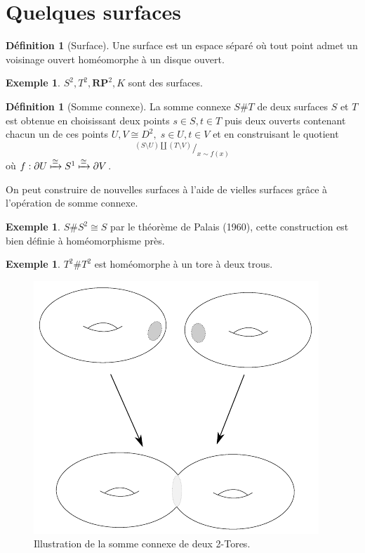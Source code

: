 \documentclass[12pt]{book}
\theoremstyle{definition}
\newtheorem{definition}[lemma]{Définition}
\newtheorem{example}[lemma]{Exemple}
\theoremstyle{remark}
\newcommand*\quot[2]{{^{\textstyle #1}\big/_{\textstyle #2}}}
\begin{document}
	\section{Quelques surfaces}
	\begin{definition}[Surface]
		Une surface est un espace séparé où tout point admet un voisinage ouvert homéomorphe à un disque ouvert.	
	\end{definition}
	\begin{example}
		$S^2, T^2, \mathbf{RP}^2, K$ sont des surfaces. 
	\end{example}
	\begin{definition}[Somme connexe]
		La somme connexe $S\#T$ de deux surfaces $S$ et $T$ est obtenue en choisissant deux points $s \in S, t \in T$ puis deux ouverts contenant chacun un de ces points $U, V \cong D^2, \; s \in U, t \in V$ et en construisant le quotient \[
			\quot{(S\setminus U)\coprod (T \setminus V)}{x\sim f(x)}
		\] 
			où $f : \partial U \xmapsto{\cong} S^1 \xmapsto{\cong} \partial V$.
	\end{definition}
	On peut construire de nouvelles surfaces à l'aide de vielles surfaces grâce à l'opération de somme connexe.
	\begin{example}
		$S\#S^2 \cong S$ par le théorème de Palais (1960), cette construction est bien définie à homéomorphisme près.
	\end{example}
	\begin{example}
		$T^2\#T^2$ est homéomorphe à un tore à deux trous.
	\end{example}
	\begin{figure}
			\centering
			\includegraphics{connectedsum.pdf}
			\caption{Illustration de la somme connexe de deux 2-Tores.}
		\end{figure}
\end{document}
